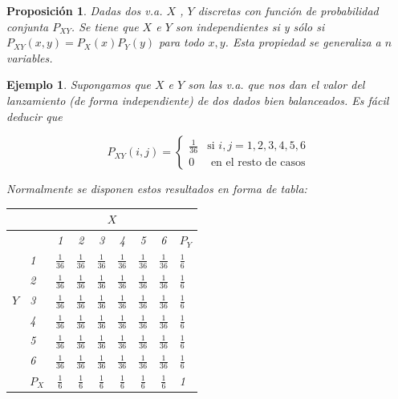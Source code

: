 \documentclass[12pt]{report}
\newtheorem{proposition}[definition]{Proposici\'on}
\newtheorem{example}[definition]{Ejemplo}
\begin{document}
  \begin{proposition}
Dadas dos v.a. $X$ , $Y$ discretas con función de probabilidad conjunta $P_{XY}$. Se tiene
que  $X$ e $Y$ son independientes si y sólo si $P_{X Y}(x,y)=P_X(x) P_Y(y)$ para todo
$x,y$. Esta propiedad se generaliza a $n$ variables.
  \end{proposition}

    \begin{example}

            Supongamos que $X$ e $Y$ son las v.a. que nos dan el valor del
            lanzamiento (de forma independiente) de dos dados bien
            ba\-lan\-cea\-dos.
            Es fácil deducir que

            $$P_{XY}(i,j)=\left\{\begin{array}{ll} \frac{1}{36} & \mbox{si }
            i,j=1,2,3,4,5,6\\

            0 & \mbox{ en el resto de casos} \end{array}\right.$$

            Normalmente se disponen estos resultados en forma de tabla:

            \begin{center}\begin{tabular}{l|l|cccccc|l}
        &\multicolumn{1}{c}{}   & \multicolumn{6}{|c|}{$X$} & \\\hline
        &    & 1 & 2 & 3 & 4 & 5 & 6 & $P_{Y}$\\\hline
            & 1 & $\frac{1}{36}$ & $\frac{1}{36}$ & $\frac{1}{36}$ & $\frac{1}{36}$ &
            $\frac{1}{36}$ & $\frac{1}{36}$ & $\frac{1}{6}$\\
            &   2 & $\frac{1}{36}$ & $\frac{1}{36}$ & $\frac{1}{36}$
                & $\frac{1}{36}$ &
            $\frac{1}{36}$ & $\frac{1}{36}$ & $\frac{1}{6}$\\
        $Y$ &   3 & $\frac{1}{36}$ & $\frac{1}{36}$ & $\frac{1}{36}$
                & $\frac{1}{36}$ &
            $\frac{1}{36}$ & $\frac{1}{36}$ & $\frac{1}{6}$\\
            &   4 & $\frac{1}{36}$ & $\frac{1}{36}$ & $\frac{1}{36}$
                & $\frac{1}{36}$ &
            $\frac{1}{36}$ & $\frac{1}{36}$ & $\frac{1}{6}$\\
            &   5 & $\frac{1}{36}$ & $\frac{1}{36}$ & $\frac{1}{36}$
                & $\frac{1}{36}$ &
            $\frac{1}{36}$ & $\frac{1}{36}$ & $\frac{1}{6}$\\
            &   6 & $\frac{1}{36}$ & $\frac{1}{36}$ & $\frac{1}{36}$
                & $\frac{1}{36}$ &
        $\frac{1}{36}$ & $\frac{1}{36}$ & $\frac{1}{6}$\\\hline
        &   $P_{X}$ & $\frac{1}{6}$& $\frac{1}{6}$& $\frac{1}{6}$&
            $\frac{1}{6}$&
            $\frac{1}{6}$& $\frac{1}{6}$ & 1
            \end{tabular}
\end{center}


\end{example}
\end{document}
